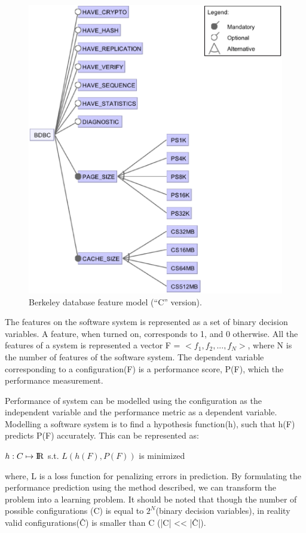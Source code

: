 \documentclass{sig-alternative}
\begin{document}
\begin{figure}[!t]
\includegraphics[width=0.9\linewidth]{Figures/BDBC.eps}
\caption{ Berkeley database feature model   (``C'' version). }\label{fig:bdbc}
\end{figure}
    
    The features on the software system is represented as a set of binary decision variables. A feature, when turned on, corresponds to 1, and 0 otherwise. All the features of a system is represented a vector F = $<f_1, f_2, ...,f_N>$, where N is the number of features of the software system. The dependent variable corresponding to a configuration(F) is a performance score, P(F), which the performance measurement.

    Performance of system can be modelled using the configuration as the independent variable and the performance metric as a dependent variable. Modelling a software system is to find a hypothesis function(h), such that h(F) predicts P(F) accurately. This can be represented as:\\
\begin{center}
    $ h: C \mapsto \rm I\!R$ s.t. $L(h(F), P(F))$ is minimized\\
\end{center}

where, L is a loss function for penalizing errors in prediction. By formulating the performance prediction using the method described, we can transform the problem into a learning problem. 
    It should be noted that though the number of possible configurations (C) is equal to $2^N$(binary decision variables), in reality valid configurations(\^{C}) is smaller than C (|C| << |\^C|). 
\end{document}
